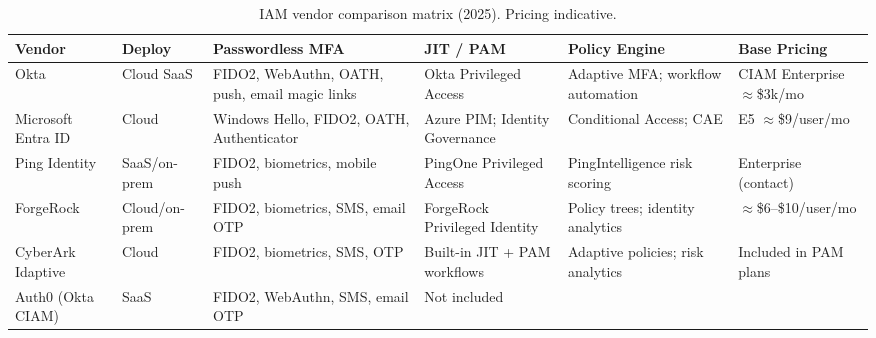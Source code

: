 \documentclass[sigconf,nonacm]{acmart}
\begin{document}
\begin{table}[t]
\caption{IAM vendor comparison matrix (2025). Pricing indicative.}
\label{tab:vendors}
\small
\setlength{\tabcolsep}{4.5pt}
\begin{tabularx}{\textwidth}{@{}
  p{1.7cm}          %
  p{1.6cm}          %
  p{2.8cm}          %
  p{2.4cm}          %
  p{2.4cm}          %
  X                 %
@{}}
\toprule
\textbf{Vendor} & \textbf{Deploy} & \textbf{Passwordless MFA} &
\textbf{JIT / PAM} & \textbf{Policy Engine} & \textbf{Base Pricing} \\
\midrule
Okta            & Cloud SaaS   & FIDO2, WebAuthn, OATH, push, email magic links~\cite{okta2024}
                               & Okta Privileged Access
                               & Adaptive MFA; workflow automation
                               & CIAM Enterprise $\approx$\$3k/mo \\
\addlinespace[3pt]
Microsoft Entra ID & Cloud     & Windows Hello, FIDO2, OATH, Authenticator~\cite{msft2024}
                               & Azure PIM; Identity Governance
                               & Conditional Access; CAE
                               & E5 $\approx$\$9/user/mo \\
\addlinespace[3pt]
Ping Identity   & SaaS/on-prem & FIDO2, biometrics, mobile push~\cite{ping2024pass}
                               & PingOne Privileged Access
                               & PingIntelligence risk scoring
                               & Enterprise (contact) \\
\addlinespace[3pt]
ForgeRock       & Cloud/on-prem & FIDO2, biometrics, SMS, email OTP
                               & ForgeRock Privileged Identity
                               & Policy trees; identity analytics
                               & $\approx$\$6--\$10/user/mo \\
\addlinespace[3pt]
CyberArk Idaptive & Cloud      & FIDO2, biometrics, SMS, OTP
                               & Built-in JIT + PAM workflows
                               & Adaptive policies; risk analytics
                               & Included in PAM plans \\
\addlinespace[3pt]
Auth0 (Okta CIAM) & SaaS       & FIDO2, WebAuthn, SMS, email OTP
                               & Not included

\end{tabularx}
\end{table}
\end{document}
